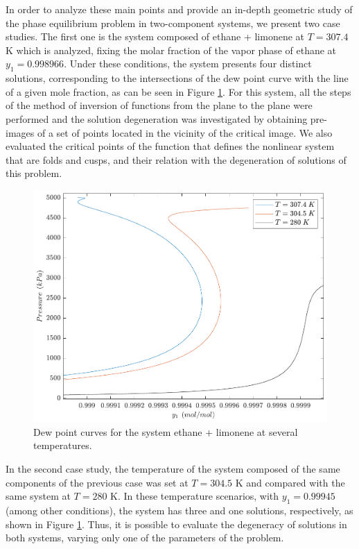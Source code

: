 \documentclass[journal=iecred,manuscript=article]{achemso}
\theoremstyle{definition}
\theoremstyle{remark}
\begin{document}
In order to analyze these main points and provide an in-depth 
geometric study of the phase equilibrium problem in two-component systems, we present two case studies.
The first one is the system composed of ethane + limonene at 
$ T = 307.4 $ K which is analyzed, fixing the molar fraction of the vapor phase of ethane at $ y_{1} = 0.998966 $.
 Under these conditions, the system presents four distinct solutions,
corresponding to the intersections of the dew point curve 
with the line of a given mole fraction, as can be seen in 
Figure \ref{fig:dew_point_curve}. For this system, all the
 steps of the method of inversion of functions from the plane 
 to the plane were performed and the solution degeneration was 
 investigated by obtaining pre-images of a set of points 
 located in the vicinity of the critical image. We also 
 evaluated the critical points of the 
function that defines the nonlinear system 
that are folds and cusps, and their relation with the degeneration of solutions of this problem.

\begin{figure}
	\begin{center}
		\includegraphics[scale=0.50]{curvas_ponto_orvalho.pdf}
		\caption{Dew point curves for the system ethane + limonene at several temperatures.}\label{fig:dew_point_curve}
	\end{center}
\end{figure}

In the second case study,  the temperature of the system 
composed of the same components of the previous case was set at  $ T = 304.5 $ K and compared 
 with the same system at $T = 280$ K. In these temperature
 scenarios, with $ y_1 = 0.99945 $ (among other conditions), the system has
  three and one solutions, respectively, as shown in Figure \ref{fig:dew_point_curve}. Thus, it is
   possible to evaluate the degeneracy of solutions in both systems, varying only one of the parameters of the problem.
\end{document}
